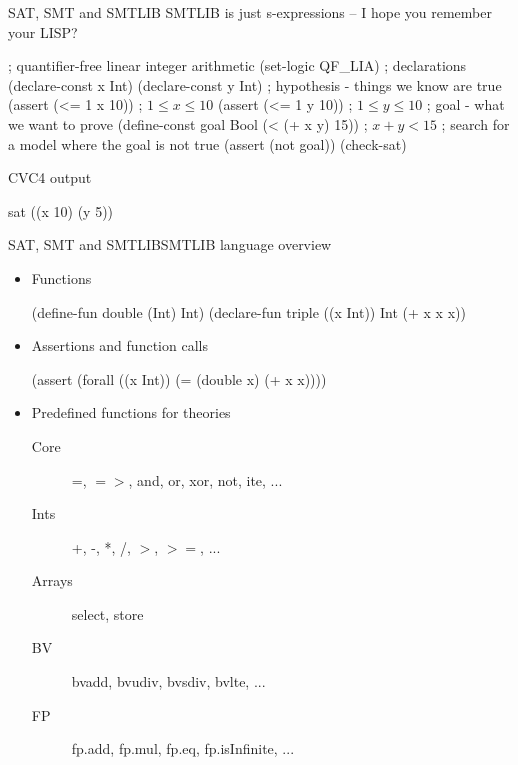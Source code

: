 \documentclass{beamer}
\begin{document}
\begin{frame}[fragile]{SAT, SMT and SMTLIB}
  SMTLIB is just s-expressions -- I hope you remember your LISP?
  \begin{pxcode}[language=SMTLIB,gobble=4]
    ; quantifier-free linear integer arithmetic
    (set-logic QF_LIA)
    ; declarations
    (declare-const x Int)
    (declare-const y Int)
    ; hypothesis - things we know are true
    (assert (<= 1 x 10)) ; $1 \leq x \leq 10$
    (assert (<= 1 y 10)) ; $1 \leq y \leq 10$
    ; goal - what we want to prove
    (define-const goal Bool (< (+ x y) 15)) ; $x + y < 15$
    ; search for a model where the goal is not true
    (assert (not goal))
    (check-sat)
  \end{pxcode}
  \pause
  \begin{block}{CVC4 output}
    \begin{pxcode}[gobble=6]
      sat
      ((x 10) (y 5))
    \end{pxcode}
  \end{block}
\end{frame}

\begin{frame}[fragile]{SAT, SMT and SMTLIB}{SMTLIB language overview}
  \begin{itemize}
  \item Functions
    \begin{pxcode}[language=SMTLIB,gobble=6]
      (define-fun double (Int) Int)
      (declare-fun triple ((x Int)) Int (+ x x x))
    \end{pxcode}
  \item Assertions and function calls
    \begin{pxcode}[language=SMTLIB,gobble=6]
      (assert (forall ((x Int)) (= (double x) (+ x x))))
    \end{pxcode}
  \item Predefined functions for theories
    \begin{description}
    \item[Core] =, $=>$, and, or, xor, not, ite, ...
    \item[Ints] +, -, *, /, $>$, $>=$, ...
    \item[Arrays] select, store
    \item[BV] bvadd, bvudiv, bvsdiv, bvlte, ...
    \item[FP] fp.add, fp.mul, fp.eq, fp.isInfinite, ...
    \end{description}
  \end{itemize}
\end{frame}
\end{document}
